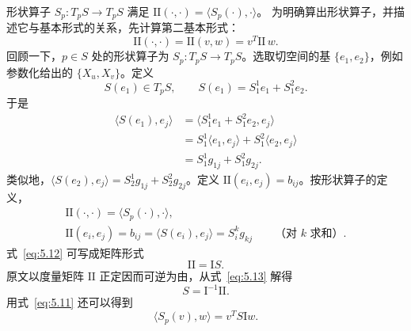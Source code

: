 \begin{itemize}
  形状算子 $S_p\colon T_pS\to T_pS$ 满足
  $\mathrm{II}(\cdot,\cdot)=\langle S_p(\cdot),\cdot\rangle$。
  为明确算出形状算子，并描述它与基本形式的关系，先计算第二基本形式：
  \begin{equation*}
    \mathrm{II}(\cdot,\cdot)=\mathrm{II}(v,w)=v^T\mathrm{II}\,w.
    \tag{5.11}\label{eq:5.11}
  \end{equation*}
  回顾一下，$p\in S$ 处的形状算子为 $S_p\colon T_pS\to T_pS$。选取切空间的基 $\{e_1,e_2\}$，例如参数化给出的 $\{X_u,X_v\}$。定义
  \[
    S(e_1)\in T_pS,\qquad S(e_1)=S_1^1e_1+S_1^2e_2.
  \]
  于是
  \[
    \begin{aligned}
      \langle S(e_1),e_j\rangle
        &=\langle S_1^1e_1+S_1^2e_2,e_j\rangle\\
        &=S_1^1\langle e_1,e_j\rangle+S_1^2\langle e_2,e_j\rangle\\
        &=S_1^1g_{1j}+S_1^2g_{2j}.
    \end{aligned}
  \]
  类似地，$\langle S(e_2),e_j\rangle=S_2^1g_{1j}+S_2^2g_{2j}$。定义
  $\mathrm{II}(e_i,e_j)=b_{ij}$。按形状算子的定义，
  \begin{equation*}
    \begin{gathered}
      \mathrm{II}(\cdot,\cdot)=\langle S_p(\cdot),\cdot\rangle,\\
      \mathrm{II}(e_i,e_j)=b_{ij}=\langle S(e_i),e_j\rangle
        =S_i^kg_{kj}\qquad\text{（对 }k\text{ 求和）}.
    \end{gathered}
    \tag{5.12}\label{eq:5.12}
  \end{equation*}
  式~\eqref{eq:5.12} 可写成矩阵形式
  \begin{equation*}
    \mathrm{II}=\mathrm I S.
    \tag{5.13}\label{eq:5.13}
  \end{equation*}
  原文以度量矩阵 $\mathrm{II}$ 正定因而可逆为由，从式~\eqref{eq:5.13} 解得
  \begin{equation*}
    S=\mathrm I^{-1}\mathrm{II}.
    \tag{5.14}\label{eq:5.14}
  \end{equation*}
  用式~\eqref{eq:5.11} 还可以得到
  \begin{equation*}
    \langle S_p(v),w\rangle=v^TS\mathrm I w.
    \tag{5.15}\label{eq:5.15}
  \end{equation*}
\end{itemize}

